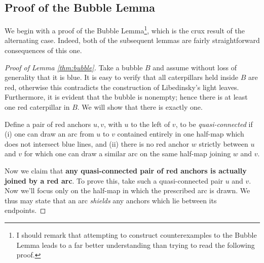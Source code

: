 \subsection{Proof of the Bubble Lemma}
We begin with a proof of the Bubble Lemma\footnote{I should remark that attempting to construct counterexamples to the Bubble Lemma leads to a far better understanding than trying to read the following proof.}, which is the crux result of the alternating case.  Indeed, both of the subsequent lemmas are fairly straightforward consequences of this one.  

\begin{proof}[Proof of Lemma \ref{thm:bubble}]
	Take a bubble $B$ and assume without loss of generality that it is blue.  It is easy to verify that all caterpillars held inside $B$ are red, otherwise this contradicts the construction of Libedinsky's light leaves.  Furthermore, it is evident that the bubble is nonempty; hence there is at least one red caterpillar in $B$.  We will show that there is exactly one.

	Define a pair of red anchors $u, v$, with $u$ to the left of $v$, to be \emph{quasi-connected} if (i) one can draw an arc from $u$ to $v$ contained entirely in one half-map which does not intersect blue lines, and (ii) there is no red anchor $w$ strictly between $u$ and $v$ for which one can draw a similar arc on the same half-map joining $w$ and $v$.

	Now we claim that \textbf{any quasi-connected pair of red anchors is actually joined by a red arc}.  To prove this, take such a quasi-connected pair $u$ and $v$.  Now we'll focus only on the half-map in which the prescribed arc is drawn.  We thus may state that an arc \emph{shields} any anchors which lie between its endpoints.
	

\end{proof}
